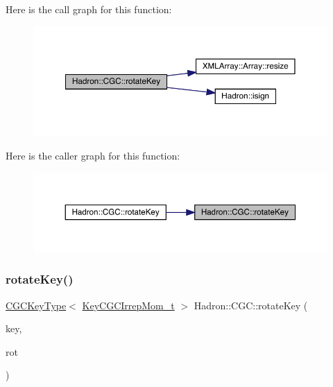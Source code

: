 Here is the call graph for this function\+:\nopagebreak
\begin{figure}[H]
\begin{center}
\leavevmode
\includegraphics[width=350pt]{d9/d19/namespaceHadron_1_1CGC_acdc26e4dd88e281dc6675da8d6d1b13d_cgraph}
\end{center}
\end{figure}
Here is the caller graph for this function\+:\nopagebreak
\begin{figure}[H]
\begin{center}
\leavevmode
\includegraphics[width=350pt]{d9/d19/namespaceHadron_1_1CGC_acdc26e4dd88e281dc6675da8d6d1b13d_icgraph}
\end{center}
\end{figure}
\mbox{\label{namespaceHadron_1_1CGC_ad5f1f6f8b8dd82238f3efeb03d1dc6e5}} 
\subsubsection{\texorpdfstring{rotateKey()}{rotateKey()}\hspace{0.1cm}{\footnotesize\ttfamily [2/2]}}
{\footnotesize\ttfamily \mbox{\hyperlink{structHadron_1_1CGCKeyType}{C\+G\+C\+Key\+Type}}$<$ \mbox{\hyperlink{structHadron_1_1KeyCGCIrrepMom__t}{Key\+C\+G\+C\+Irrep\+Mom\+\_\+t}} $>$ Hadron\+::\+C\+G\+C\+::rotate\+Key (\begin{DoxyParamCaption}\item[{const \mbox{\hyperlink{structHadron_1_1CGCKeyType}{C\+G\+C\+Key\+Type}}$<$ \mbox{\hyperlink{structHadron_1_1KeyCGCIrrepMom__t}{Key\+C\+G\+C\+Irrep\+Mom\+\_\+t}} $>$ \&}]{key,  }\item[{const \mbox{\hyperlink{structHadron_1_1RotateVec__t}{Rotate\+Vec\+\_\+t}} \&}]{rot }\end{DoxyParamCaption})}


